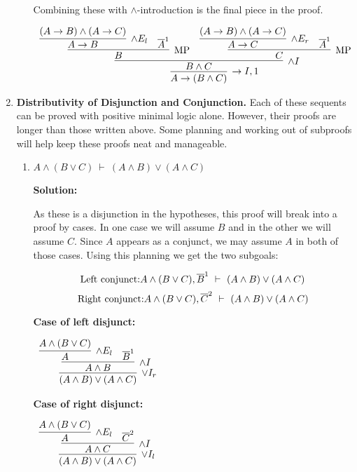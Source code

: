 \documentclass[11pt]{report}
\newcommand{\temp}[2]{{\overline{#2}}^{#1}}
\begin{document}
\begin{enumerate}
\begin{enumerate}
		Combining these with $\land$-introduction is the final piece in the proof. 
		\begin{center}
			$\begin{array}{c} 
				\infer[\to I, 1]{A \to (B \land C)}
					{\infer[\land I]{B \land C}
						{\infer[\MP]{B}
							{\infer[\land E_{l}]{A \to B}{(A \to B) \land (A \to C)}
							&
							\temp{1}{A}}
							&
						\infer[\MP]{C}
							{\infer[\land E_{r}]{A \to C}{(A \to B) \land (A \to C)}
							&
							\temp{1}{A}}}}
			\end{array}$
		\end{center}


	\end{enumerate}	

	\newpage
	\item \textbf{Distributivity of Disjunction and Conjunction.} Each of these sequents can be proved with positive minimal logic alone. However, their proofs are longer than those written above. Some planning and working out of subproofs will help keep these proofs neat and manageable. 

	\begin{enumerate}
		\item $A \land (B \lor C) \ \vdash \ (A \land B) \lor (A \land C)$
		
		\textbf{Solution:}

		As these is a disjunction in the hypotheses, this proof will break into a proof by cases. In one case we will assume $B$ and in the other we will assume $C$. Since $A$ appears as a conjunct, we may assume $A$ in both of those cases. Using this planning we get the two subgoals: 

		$$\textnormal{Left conjunct:} A \land (B \lor C), \temp{1}{B} \ \vdash \ (A \land B) \lor (A \land C)$$
		$$\textnormal{Right conjunct:} A \land (B \lor C), \temp{2}{C} \ \vdash \ (A \land B) \lor (A \land C)$$

		\textbf{Case of left disjunct:}

		\begin{center}
			$\begin{array}{c}
				\infer[\lor I_{r}]{(A \land B) \lor (A \land C)}
					{\infer[\land I]{A \land B}
						{\infer[\land E_{l}]{A}{A \land (B \lor C)}
							&
						\temp{1}{B}}}
			\end{array}$
		\end{center}

		\textbf{Case of right disjunct:}

		\begin{center}
			$\begin{array}{c}
				\infer[\lor I_{l}]{(A \land B) \lor (A \land C)}
					{\infer[\land I]{A \land C}
						{\infer[\land E_{l}]{A}{A \land (B \lor C)}
							&
						\temp{2}{C}}}
			\end{array}$
		\end{center}


\end{enumerate}
\end{enumerate}
\end{document}
